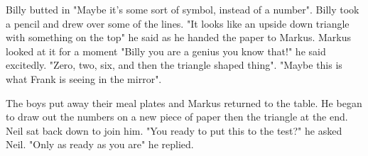 \documentclass[12pt]{book}
\begin{document}
Billy butted in "Maybe it's some sort of symbol, instead of a number". Billy took a pencil and drew over some of the lines. "It looks like an upside down triangle with something on the top" he said as he handed the paper to Markus. Markus looked at it for a moment "Billy you are a genius you know that!" he said excitedly. "Zero, two, six, and then the triangle shaped thing". "Maybe this is what Frank is seeing in the mirror".

The boys put away their meal plates and Markus returned to the table. He began to draw out the numbers on a new piece of paper then the triangle at the end. Neil sat back down to join him. "You ready to put this to the test?" he asked Neil. "Only as ready as you are" he replied.
\end{document}
